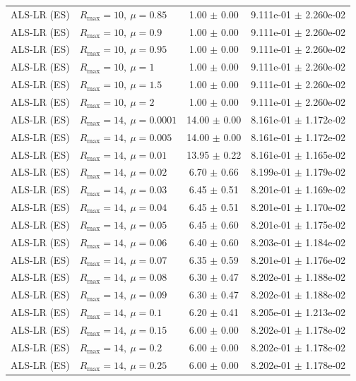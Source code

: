 \begin{table}[t]
\begin{tabular}{@{}llcc@{}}
ALS-LR (ES) & \(R_{\max}=10,\ \mu=0.85\) & 1.00 $\pm$ 0.00 & 9.111e-01 $\pm$ 2.260e-02 \\
ALS-LR (ES) & \(R_{\max}=10,\ \mu=0.9\) & 1.00 $\pm$ 0.00 & 9.111e-01 $\pm$ 2.260e-02 \\
ALS-LR (ES) & \(R_{\max}=10,\ \mu=0.95\) & 1.00 $\pm$ 0.00 & 9.111e-01 $\pm$ 2.260e-02 \\
ALS-LR (ES) & \(R_{\max}=10,\ \mu=1\) & 1.00 $\pm$ 0.00 & 9.111e-01 $\pm$ 2.260e-02 \\
ALS-LR (ES) & \(R_{\max}=10,\ \mu=1.5\) & 1.00 $\pm$ 0.00 & 9.111e-01 $\pm$ 2.260e-02 \\
ALS-LR (ES) & \(R_{\max}=10,\ \mu=2\) & 1.00 $\pm$ 0.00 & 9.111e-01 $\pm$ 2.260e-02 \\
ALS-LR (ES) & \(R_{\max}=14,\ \mu=0.0001\) & 14.00 $\pm$ 0.00 & 8.161e-01 $\pm$ 1.172e-02 \\
ALS-LR (ES) & \(R_{\max}=14,\ \mu=0.005\) & 14.00 $\pm$ 0.00 & 8.161e-01 $\pm$ 1.172e-02 \\
ALS-LR (ES) & \(R_{\max}=14,\ \mu=0.01\) & 13.95 $\pm$ 0.22 & 8.161e-01 $\pm$ 1.165e-02 \\
ALS-LR (ES) & \(R_{\max}=14,\ \mu=0.02\) & 6.70 $\pm$ 0.66 & 8.199e-01 $\pm$ 1.179e-02 \\
ALS-LR (ES) & \(R_{\max}=14,\ \mu=0.03\) & 6.45 $\pm$ 0.51 & 8.201e-01 $\pm$ 1.169e-02 \\
ALS-LR (ES) & \(R_{\max}=14,\ \mu=0.04\) & 6.45 $\pm$ 0.51 & 8.201e-01 $\pm$ 1.170e-02 \\
ALS-LR (ES) & \(R_{\max}=14,\ \mu=0.05\) & 6.45 $\pm$ 0.60 & 8.201e-01 $\pm$ 1.175e-02 \\
ALS-LR (ES) & \(R_{\max}=14,\ \mu=0.06\) & 6.40 $\pm$ 0.60 & 8.203e-01 $\pm$ 1.184e-02 \\
ALS-LR (ES) & \(R_{\max}=14,\ \mu=0.07\) & 6.35 $\pm$ 0.59 & 8.201e-01 $\pm$ 1.176e-02 \\
ALS-LR (ES) & \(R_{\max}=14,\ \mu=0.08\) & 6.30 $\pm$ 0.47 & 8.202e-01 $\pm$ 1.188e-02 \\
ALS-LR (ES) & \(R_{\max}=14,\ \mu=0.09\) & 6.30 $\pm$ 0.47 & 8.202e-01 $\pm$ 1.188e-02 \\
ALS-LR (ES) & \(R_{\max}=14,\ \mu=0.1\) & 6.20 $\pm$ 0.41 & 8.205e-01 $\pm$ 1.213e-02 \\
ALS-LR (ES) & \(R_{\max}=14,\ \mu=0.15\) & 6.00 $\pm$ 0.00 & 8.202e-01 $\pm$ 1.178e-02 \\
ALS-LR (ES) & \(R_{\max}=14,\ \mu=0.2\) & 6.00 $\pm$ 0.00 & 8.202e-01 $\pm$ 1.178e-02 \\
ALS-LR (ES) & \(R_{\max}=14,\ \mu=0.25\) & 6.00 $\pm$ 0.00 & 8.202e-01 $\pm$ 1.178e-02 \\

\end{tabular}
\end{table}
